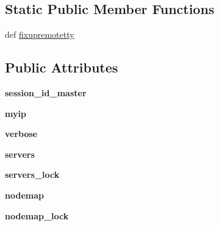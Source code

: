 \subsection*{Static Public Member Functions}
\begin{DoxyCompactItemize}
\item 
def \hyperlink{classcore_1_1broker_1_1_core_broker_ae20748006a43afe488d3451bdad9759b}{fixupremotetty}
\end{DoxyCompactItemize}
\subsection*{Public Attributes}
\begin{DoxyCompactItemize}
\item 
\hypertarget{classcore_1_1broker_1_1_core_broker_a01e3c7ba570e019db18b109931e3fd22}{{\bfseries session\+\_\+id\+\_\+master}}\label{classcore_1_1broker_1_1_core_broker_a01e3c7ba570e019db18b109931e3fd22}

\item 
\hypertarget{classcore_1_1broker_1_1_core_broker_a4b7abc2619a2f1f6d43f0802e80760c0}{{\bfseries myip}}\label{classcore_1_1broker_1_1_core_broker_a4b7abc2619a2f1f6d43f0802e80760c0}

\item 
\hypertarget{classcore_1_1broker_1_1_core_broker_a93794410b832e001ddf7493655032818}{{\bfseries verbose}}\label{classcore_1_1broker_1_1_core_broker_a93794410b832e001ddf7493655032818}

\item 
\hypertarget{classcore_1_1broker_1_1_core_broker_a8b96c9a427ea1a46a3ddbf58a590a73b}{{\bfseries servers}}\label{classcore_1_1broker_1_1_core_broker_a8b96c9a427ea1a46a3ddbf58a590a73b}

\item 
\hypertarget{classcore_1_1broker_1_1_core_broker_a465cbcfa48286ec6a19b1ec54d42941f}{{\bfseries servers\+\_\+lock}}\label{classcore_1_1broker_1_1_core_broker_a465cbcfa48286ec6a19b1ec54d42941f}

\item 
\hypertarget{classcore_1_1broker_1_1_core_broker_a727b7274501da7807c995c3a9c93549d}{{\bfseries nodemap}}\label{classcore_1_1broker_1_1_core_broker_a727b7274501da7807c995c3a9c93549d}

\item 
\hypertarget{classcore_1_1broker_1_1_core_broker_a52566fd1fbcb3efa79cc29774bcc7781}{{\bfseries nodemap\+\_\+lock}}\label{classcore_1_1broker_1_1_core_broker_a52566fd1fbcb3efa79cc29774bcc7781}


\end{DoxyCompactItemize}
